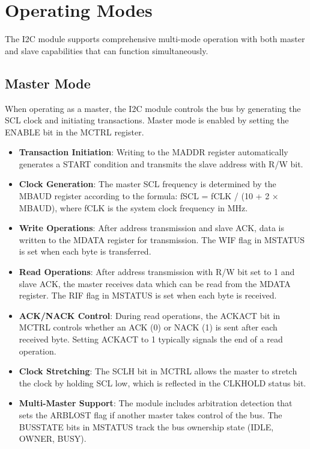 \section{Operating Modes}

The I2C module supports comprehensive multi-mode operation with both master and slave capabilities that can function simultaneously.

\subsection{Master Mode}
When operating as a master, the I2C module controls the bus by generating the SCL clock and initiating transactions. Master mode is enabled by setting the ENABLE bit in the MCTRL register.

\begin{itemize}
    \item \textbf{Transaction Initiation}: Writing to the MADDR register automatically generates a START condition and transmits the slave address with R/W bit.
    
    \item \textbf{Clock Generation}: The master SCL frequency is determined by the MBAUD register according to the formula: fSCL = fCLK / (10 + 2 × MBAUD), where fCLK is the system clock frequency in MHz.
    
    \item \textbf{Write Operations}: After address transmission and slave ACK, data is written to the MDATA register for transmission. The WIF flag in MSTATUS is set when each byte is transferred.
    
    \item \textbf{Read Operations}: After address transmission with R/W bit set to 1 and slave ACK, the master receives data which can be read from the MDATA register. The RIF flag in MSTATUS is set when each byte is received.
    
    \item \textbf{ACK/NACK Control}: During read operations, the ACKACT bit in MCTRL controls whether an ACK (0) or NACK (1) is sent after each received byte. Setting ACKACT to 1 typically signals the end of a read operation.
    
    \item \textbf{Clock Stretching}: The SCLH bit in MCTRL allows the master to stretch the clock by holding SCL low, which is reflected in the CLKHOLD status bit.
    
    \item \textbf{Multi-Master Support}: The module includes arbitration detection that sets the ARBLOST flag if another master takes control of the bus. The BUSSTATE bits in MSTATUS track the bus ownership state (IDLE, OWNER, BUSY).
\end{itemize}

